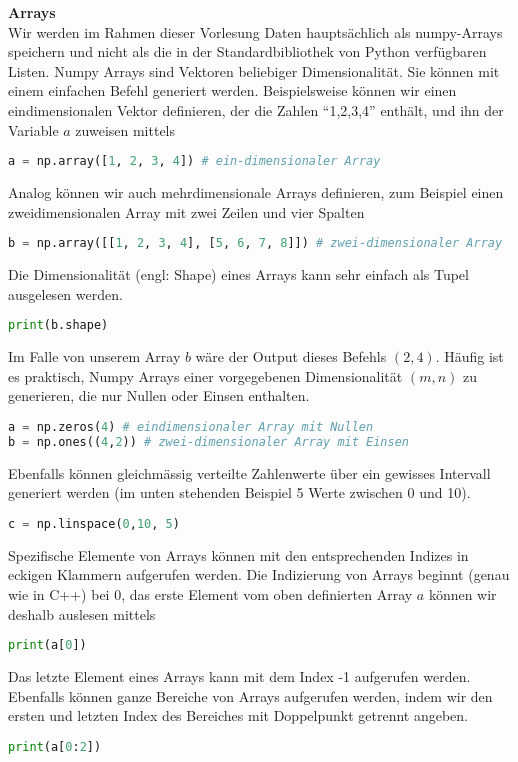 \textbf{Arrays} \\
Wir werden im Rahmen dieser Vorlesung Daten hauptsächlich als numpy-Arrays speichern und nicht als die in der Standardbibliothek von Python verfügbaren Listen. Numpy Arrays sind Vektoren beliebiger Dimensionalität. Sie können mit einem einfachen Befehl generiert werden. Beispielsweise können wir einen eindimensionalen Vektor definieren, der die Zahlen ``1,2,3,4'' enthält, und ihn der Variable $a$ zuweisen mittels
\begin{lstlisting}[language = Python]
a = np.array([1, 2, 3, 4]) # ein-dimensionaler Array
\end{lstlisting}  
Analog können wir auch mehrdimensionale Arrays definieren, zum  Beispiel einen zweidimensionalen Array mit zwei Zeilen und vier Spalten 
\begin{lstlisting}[language = Python]
b = np.array([[1, 2, 3, 4], [5, 6, 7, 8]]) # zwei-dimensionaler Array
\end{lstlisting}  
Die Dimensionalität (engl: Shape) eines Arrays kann sehr einfach als Tupel ausgelesen werden. \begin{lstlisting}[language = Python]
print(b.shape)
\end{lstlisting}
Im Falle von unserem Array $b$ wäre der Output dieses Befehls  $(2,4)$. Häufig ist es praktisch, Numpy Arrays einer vorgegebenen Dimensionalität $(m,n)$ zu generieren, die nur Nullen oder Einsen enthalten. 
\begin{lstlisting}[language = Python]
a = np.zeros(4) # eindimensionaler Array mit Nullen
b = np.ones((4,2)) # zwei-dimensionaler Array mit Einsen
\end{lstlisting}
Ebenfalls können gleichmässig verteilte Zahlenwerte über ein gewisses Intervall generiert werden (im unten stehenden Beispiel 5 Werte zwischen 0 und 10).  
\begin{lstlisting}[language = Python]
c = np.linspace(0,10, 5)
\end{lstlisting}
Spezifische Elemente von Arrays können mit den entsprechenden Indizes in eckigen Klammern aufgerufen werden. Die Indizierung von Arrays beginnt (genau wie in C++) bei 0, das erste Element vom oben definierten Array $a$ können wir deshalb auslesen mittels
\begin{lstlisting}[language = Python]
print(a[0])
\end{lstlisting}
Das letzte Element eines Arrays kann mit dem Index -1 aufgerufen werden.
Ebenfalls können ganze Bereiche von Arrays aufgerufen werden, indem wir den ersten und letzten Index des Bereiches mit Doppelpunkt getrennt angeben.
\begin{lstlisting}[language = Python]
print(a[0:2])
\end{lstlisting} 


